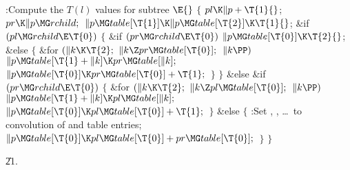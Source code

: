 \Y\B\4:Compute the $T(l)$ values for subtree \X${}\E{}$\6
${}\{{}$\1\6
${}\\{pl}\K\|p+\T{1}{}$;\5
${}\\{pr}\K\|p\MG\\{rchild};{}$\6
${}\|p\MG\\{table}[\T{1}]\K\|p\MG\\{table}[\T{2}]\K\T{1}{}$;\6
\&{if} ${}(\\{pl}\MG\\{rchild}\E\T{0}){}$\5
${}\{{}$\1\6
\&{if} ${}(\\{pr}\MG\\{rchild}\E\T{0}){}$\1\5
${}\|p\MG\\{table}[\T{0}]\K\T{2}{}$;\2\6
\&{else}\5
${}\{{}$\1\6
\&{for} ${}(\|k\K\T{2};{}$ ${}\|k\Z\\{pr}\MG\\{table}[\T{0}];{}$ ${}\|k\PP){}$%
\1\5
${}\|p\MG\\{table}[\T{1}+\|k]\K\\{pr}\MG\\{table}[\|k];{}$\2\6
${}\|p\MG\\{table}[\T{0}]\K\\{pr}\MG\\{table}[\T{0}]+\T{1};{}$\6
\4${}\}{}$\2\6
\4${}\}{}$\5
\2\&{else} \&{if} ${}(\\{pr}\MG\\{rchild}\E\T{0}){}$\5
${}\{{}$\1\6
\&{for} ${}(\|k\K\T{2};{}$ ${}\|k\Z\\{pl}\MG\\{table}[\T{0}];{}$ ${}\|k\PP){}$%
\1\5
${}\|p\MG\\{table}[\T{1}+\|k]\K\\{pl}\MG\\{table}[\|k];{}$\2\6
${}\|p\MG\\{table}[\T{0}]\K\\{pl}\MG\\{table}[\T{0}]+\T{1};{}$\6
\4${}\}{}$\5
\2\&{else}\5
${}\{{}$\1\6
:Set , , \dots\
to convolution of  and  table entries\X;\6
${}\|p\MG\\{table}[\T{0}]\K\\{pl}\MG\\{table}[\T{0}]+\\{pr}\MG\\{table}[%
\T{0}];{}$\6
\4${}\}{}$\2\6
\4${}\}{}$\2\par
\U21.\fi

